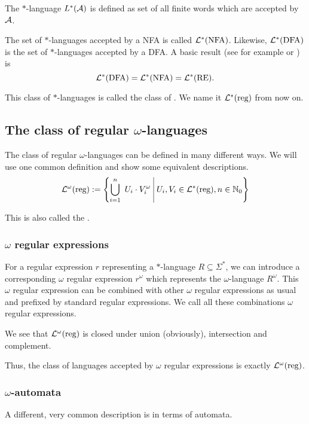 The $*$-language $L^*(\mathcal{A})$ is defined as set of all finite words which are accepted by $\mathcal{A}$.

The set of $*$-languages accepted by a NFA is called $\mathcal{L}^*(\text{NFA})$. Likewise, $\mathcal{L}^*(\text{DFA})$ is the set of $*$-languages accepted by a DFA. A basic result (see for example \cite{FinAutLogR109} or \cite{InfWordsR110}) is
\[ \mathcal{L}^*(\text{DFA}) = \mathcal{L}^*(\text{NFA}) = \mathcal{L}^*(\text{RE}) . \]

This class of $*$-languages is called the class of . We name it $\mathcal{L}^*(\text{reg})$ from now on.

\subsection{The class of regular $\omega$-languages}
\label{reg-omega-lang}

The class of regular $\omega$-languages can be defined in many different ways. We will use one common definition and show some equivalent descriptions.
\[ \LangOreg := \Set{ \bigcup_{i=1}^n\ U_i \cdot V_i^\omega }{ U_i, V_i \in \Langreg, n \in \N_0 } \]

This is also called the .

\subsubsection{$\omega$ regular expressions}

For a regular expression $r$ representing a $*$-language $R\subseteq \Sigma^*$, we can introduce a corresponding $\omega$ regular expression $r^\omega$ which represents the $\omega$-language $R^\omega$. This $\omega$ regular expression can be combined with other $\omega$ regular expressions as usual and prefixed by standard regular expressions. We call all these combinations $\omega$ regular expressions.

We see that $\mathcal{L}^\omega(\text{reg})$ is closed under union (obviously), intersection and complement.

Thus, the class of languages accepted by $\omega$ regular expressions is exactly $\mathcal{L}^\omega(\text{reg})$.


\subsubsection{$\omega$-automata}

A different, very common description is in terms of automata.

